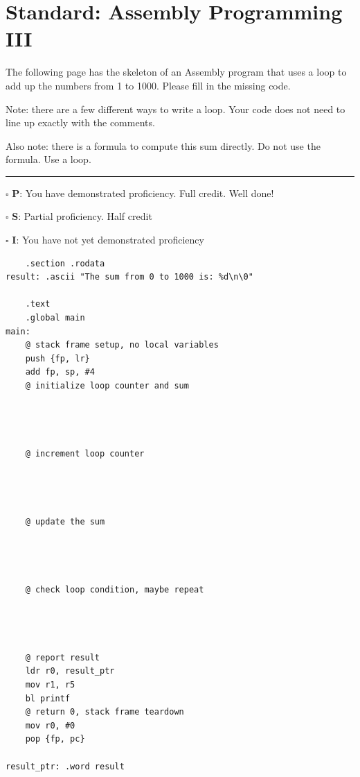 \documentclass[12pt]{article}
\begin{document}


\section*{Standard: Assembly Programming III}

The following page has the skeleton of an Assembly program that uses a loop to add up the numbers from 1 to 1000. Please fill in the missing code. 

Note: there are a few different ways to write a loop. Your code does not need to line up exactly with the comments.

Also note: there is a formula to compute this sum directly. Do not use the formula. Use a loop.

\vfill

\rule[1ex]{\textwidth}{.1pt}

$\square$ \textbf{P}: You have demonstrated proficiency. Full credit. Well done!

$\square$ \textbf{S}: Partial proficiency. Half credit

$\square$ \textbf{I}: You have not yet demonstrated proficiency

\newpage

\begin{verbatim}
    .section .rodata
result: .ascii "The sum from 0 to 1000 is: %d\n\0"

    .text
    .global main
main: 
    @ stack frame setup, no local variables
    push {fp, lr}
    add fp, sp, #4
    @ initialize loop counter and sum




    @ increment loop counter



    
    @ update the sum


    
    
    @ check loop condition, maybe repeat



    
    @ report result
    ldr r0, result_ptr
    mov r1, r5
    bl printf
    @ return 0, stack frame teardown
    mov r0, #0
    pop {fp, pc}

result_ptr: .word result
\end{verbatim}

\end{document}
